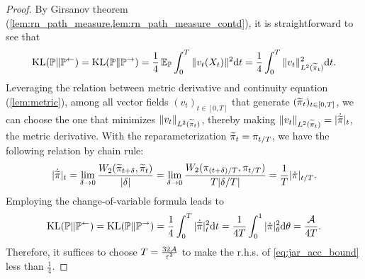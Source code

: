 \begin{proof}
By Girsanov theorem (\cref{lem:rn_path_measure,lem:rn_path_measure_contd}), it is straightforward to see that
$$\operatorname{KL}(\mathbb{P}\|\mathbb{P}^\gets)=\operatorname{KL}(\mathbb{P}\|\mathbb{P}^\to)=\frac{1}{4}\operatorname{\mathbb{E}}_{\mathbb{P}}\int_{0}^{T}\|v_t(X_t)\|^2\mathrm{d} t=\frac{1}{4}\int_{0}^{T}\|v_t\|^2_{L^2(\widetilde{\pi}_t)}\mathrm{d} t.$$
Leveraging the relation between metric derivative and continuity equation (\cref{lem:metric}), among all vector fields $(v_t)_{t\in[0,T]}$ that generate $(\widetilde{\pi}_t)_{t\in[0,T]}$, we can choose the one that minimizes $\|v_t\|_{L^2(\widetilde{\pi}_t)}$, thereby making $\|v_t\|_{L^2(\widetilde{\pi}_t)}=|\dot{\widetilde{\pi}}|_t$, the metric derivative. With the reparameterization $\widetilde{\pi}_t=\pi_{t/T}$, we have the following relation by chain rule:
$$|\dot{\widetilde{\pi}}|_t=\lim_{\delta\to0}\frac{W_2(\widetilde{\pi}_{t+\delta},\widetilde{\pi}_t)}{|\delta|}=\lim_{\delta\to0}\frac{W_2(\pi_{(t+\delta)/T},\pi_{t/T})}{T|\delta/T|}=\frac{1}{T}|\dot\pi|_{t/T}.$$
Employing the change-of-variable formula leads to
$$\operatorname{KL}(\mathbb{P}\|\mathbb{P}^\gets)=\operatorname{KL}(\mathbb{P}\|\mathbb{P}^\to)=\frac{1}{4}\int_0^T|\dot{\widetilde{\pi}}|_t^2\mathrm{d} t=\frac{1}{4T}\int_0^1|\dot\pi|_\theta^2\mathrm{d}\theta=\frac{\mathcal{A}}{4T}.$$
Therefore, it suffices to choose $T=\frac{32\mathcal{A}}{\varepsilon^2}$ to make the r.h.s. of \cref{eq:jar_acc_bound} less than $\frac{1}{4}$.
\end{proof}